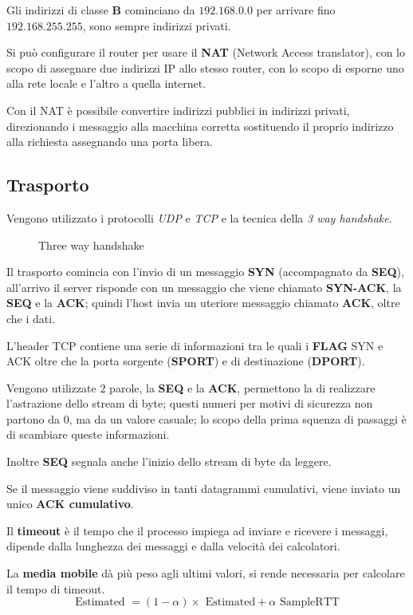 Gli indirizzi di classe \textbf{B} cominciano da $192.168.0.0$ per arrivare
fino $192.168.255.255$, sono sempre indirizzi privati.


Si può configurare il router per usare il \textbf{NAT} (Network Access
translator), con lo scopo di assegnare due indirizzi IP allo stesso router,
con lo scopo di esporne uno alla rete locale e l'altro a quella internet.

Con il NAT è possibile convertire indirizzi pubblici in indirizzi privati,
direzionando i messaggio alla macchina corretta sostituendo il proprio
indirizzo alla richiesta assegnando una porta libera.

\subsection{Trasporto}
Vengono utilizzato i protocolli \emph{UDP} e \emph{TCP} e la tecnica della
\emph{3 way handshake}.

\begin{figure}[ht]
    \centering
    \caption{Three way handshake}
    \label{fig:3some}
\end{figure}

Il trasporto comincia con l'invio di un messaggio \textbf{SYN} (accompagnato
da \textbf{SEQ}), all'arrivo
il server risponde con un messaggio che viene chiamato \textbf{SYN-ACK}, la
\textbf{SEQ} e la \textbf{ACK};
quindi l'host invia un uteriore messaggio chiamato \textbf{ACK}, oltre che
i dati.

L'header TCP contiene una serie di informazioni tra le quali i \textbf{FLAG}
SYN e ACK oltre che la porta sorgente (\textbf{SPORT}) e di destinazione
(\textbf{DPORT}).


Vengono utilizzate $2$ parole, la \textbf{SEQ} e la \textbf{ACK}, permettono
la di realizzare l'astrazione dello stream di byte; questi numeri per motivi
di sicurezza non partono da $0$, ma da un valore casuale; lo scopo della
prima squenza di passaggi è di scambiare queste informazioni.

Inoltre \textbf{SEQ} segnala anche l'inizio dello stream di byte da leggere.

Se il messaggio viene suddiviso in tanti datagrammi cumulativi, viene inviato un unico \textbf{ACK cumulativo}.

Il \textbf{timeout} è il tempo che il processo impiega ad inviare e ricevere i
messaggi, dipende dalla lunghezza dei messaggi e dalla velocità dei
calcolatori.

La \textbf{media mobile} dà più peso agli ultimi valori, si rende necessaria
per calcolare il tempo di timeout.
\[
  \text{Estimated }=(1-\alpha)\times\text{ Estimated}+\alpha\text{ SampleRTT}
\]

